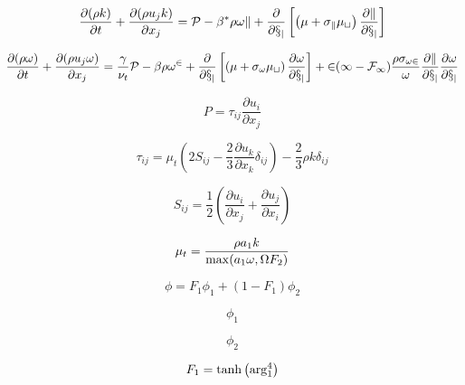 

\begin{equation}
\frac{\partial (\rho k)}{\partial t} + \frac{\partial (\rho u_j k)}{\partial x_j}
  = \cal P - \beta^* \rho \omega k  + \frac{\partial}{\partial x_j}
  \left[\left(\mu + \sigma_k \mu_t \right)\frac{\partial k}{\partial x_j}\right]
\end{equation}

\begin{equation}
\frac{\partial (\rho \omega)}{\partial t} + \frac{\partial (\rho u_j \omega)}{\partial x_j}
  = \frac{\gamma}{\nu_t} \cal P -
  \beta \rho \omega^2 + \frac{\partial}{\partial x_j}
  \left[ \left( \mu + \sigma_{\omega} \mu_t \right)
  \frac{\partial \omega}{\partial x_j} \right] +
  2(1-F_1) \frac{\rho \sigma_{\omega 2}}{\omega} \frac{\partial k}{\partial x_j}
  \frac{\partial \omega}{\partial x_j}
\end{equation}

\begin{equation}
P = \tau_{ij} \frac{\partial u_i}{\partial x_j}
\end{equation}

\begin{equation}
\tau_{ij} = \mu_t \left(2S_{ij} - \frac{2}{3} \frac{\partial u_k}{\partial x_k} \delta_{ij} \right)
   - \frac{2}{3} \rho k \delta_{ij}
\end{equation}

\begin{equation}
S_{ij} = \frac{1}{2} \left( \frac{\partial u_i}{\partial x_j} + \frac{\partial u_j}{\partial x_i} \right)
\end{equation}

\begin{equation}
\mu_t = \frac{\rho a_1 k}{{\rm max} (a_1 \omega, \Omega F_2)}
\end{equation}

\begin{equation}
\phi = F_1 \phi_1 + (1-F_1) \phi_2
\end{equation}

\begin{equation}
\phi_1
\end{equation}

\begin{equation}
\phi_2
\end{equation}

\begin{equation}
F_1 = {\rm tanh} \left({\rm arg}_1^4 \right)
\end{equation}

